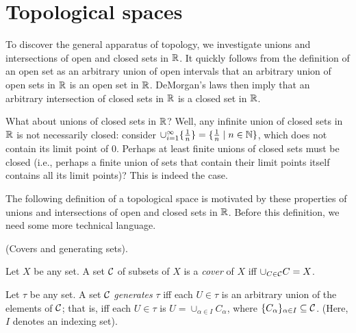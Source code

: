 \section{Topological spaces}

To discover the general apparatus of topology, we investigate unions and intersections of open and closed sets in $\mathbb{R}$. It quickly follows from the definition of an open set as an arbitrary union of open intervals that an arbitrary union of open sets in $\mathbb{R}$ is an open set in $\mathbb{R}$. DeMorgan's laws then imply that an arbitrary intersection of closed sets in $\mathbb{R}$ is a closed set in $\mathbb{R}$.

What about unions of closed sets in $\mathbb{R}$? Well, any infinite union of closed sets in $\mathbb{R}$ is not necessarily closed: consider $\cup_{i = 1}^\infty \{\frac{1}{n}\} = \{\frac{1}{n} \mid n \in \mathbb{N} \}$, which does not contain its limit point of $0$. Perhaps at least finite unions of closed sets must be closed (i.e., perhaps a finite union of sets that contain their limit points itself contains all its limit points)? This is indeed the case.

The following definition of a topological space is motivated by these properties of unions and intersections of open and closed sets in $\mathbb{R}$. Before this definition, we need some more technical language.


\newpage

\begin{defn}
    (Covers and generating sets).
    
    Let $X$ be any set. A set $\mathcal{C}$ of subsets of $X$ is a \textit{cover} of $X$ iff $\cup_{C \in \mathcal{C}} C = X$.
    
    Let $\tau$ be any set. A set $\mathcal{C}$ \textit{generates} $\tau$ iff each $U \in \tau$ is an arbitrary union of the elements of $\mathcal{C}$; that is, iff each $U \in \tau$ is $U = \cup_{\alpha \in I} C_\alpha$, where $\{C_\alpha\}_{\alpha \in I} \subseteq \mathcal{C}$. (Here, $I$ denotes an indexing set).
\end{defn}

